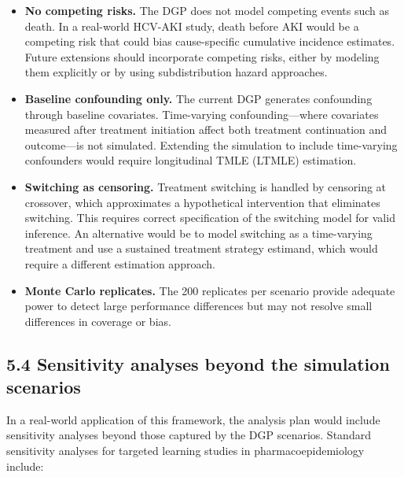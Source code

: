 \documentclass[
  letterpaper,
  DIV=11,
  numbers=noendperiod]{scrartcl}
\begin{document}
\begin{itemize}
\item
  \textbf{No competing risks.} The DGP does not model competing events
  such as death. In a real-world HCV-AKI study, death before AKI would
  be a competing risk that could bias cause-specific cumulative
  incidence estimates. Future extensions should incorporate competing
  risks, either by modeling them explicitly or by using subdistribution
  hazard approaches.
\item
  \textbf{Baseline confounding only.} The current DGP generates
  confounding through baseline covariates. Time-varying
  confounding---where covariates measured after treatment initiation
  affect both treatment continuation and outcome---is not simulated.
  Extending the simulation to include time-varying confounders would
  require longitudinal TMLE (LTMLE) estimation.
\item
  \textbf{Switching as censoring.} Treatment switching is handled by
  censoring at crossover, which approximates a hypothetical intervention
  that eliminates switching. This requires correct specification of the
  switching model for valid inference. An alternative would be to model
  switching as a time-varying treatment and use a sustained treatment
  strategy estimand, which would require a different estimation
  approach.
\item
  \textbf{Monte Carlo replicates.} The 200 replicates per scenario
  provide adequate power to detect large performance differences but may
  not resolve small differences in coverage or bias.
\end{itemize}

\subsection{5.4 Sensitivity analyses beyond the simulation
scenarios}\label{sensitivity-analyses-beyond-the-simulation-scenarios}

In a real-world application of this framework, the analysis plan would
include sensitivity analyses beyond those captured by the DGP scenarios.
Standard sensitivity analyses for targeted learning studies in
pharmacoepidemiology include:
\end{document}
